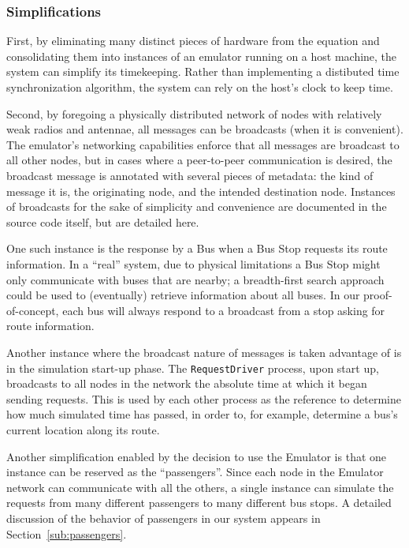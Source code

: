 \documentclass[runningheads]{llncs}
\begin{document}
\subsubsection{Simplifications}
First, by eliminating many distinct pieces of hardware from the equation and consolidating them into instances of an emulator running on a host machine, the system can simplify its timekeeping. Rather than implementing a distibuted time synchronization algorithm, the system can rely on the host's clock to keep time.

Second, by foregoing a physically distributed network of nodes with relatively weak radios and antennae, all messages can be broadcasts (when it is convenient). The emulator's networking capabilities enforce that all messages are broadcast to all other nodes, but in cases where a peer-to-peer communication is desired, the broadcast message is annotated with several pieces of metadata: the kind of message it is, the originating node, and the intended destination node. Instances of broadcasts for the sake of simplicity and convenience are documented in the source code itself, but are detailed here.

One such instance is the response by a Bus when a Bus Stop requests its route information. In a ``real'' system, due to physical limitations a Bus Stop might only communicate with buses that are nearby; a breadth-first search approach could be used to (eventually) retrieve information about all buses. In our proof-of-concept, each bus will always respond to a broadcast from a stop asking for route information.

Another instance where the broadcast nature of messages is taken advantage of is in the simulation start-up phase. The \lstinline{RequestDriver} process, upon start up, broadcasts to all nodes in the network the absolute time at which it began sending requests. This is used by each other process as the reference to determine how much simulated time has passed, in order to, for example, determine a bus's current location along its route.

Another simplification enabled by the decision to use the Emulator is that one instance can be reserved as the ``passengers''. Since each node in the Emulator network can communicate with all the others, a single instance can simulate the requests from many different passengers to many different bus stops. A detailed discussion of the behavior of passengers in our system appears in Section~\ref{sub:passengers}.
\end{document}
